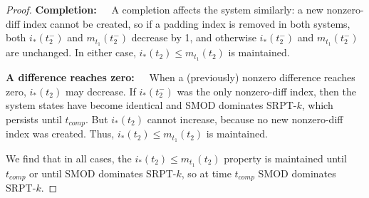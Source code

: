 \documentclass[acmsmall]{acmart}
\begin{document}
\begin{proof}
    \textbf{Completion:~~} A completion affects the system similarly: a new nonzero-diff index cannot be created, so if a padding index is removed in both systems, both $i_*(t_2^-)$ and $m_{t_1}(t_2^-)$ decrease by 1, and otherwise $i_*(t_2^-)$ and $m_{t_1}(t_2^-)$ are unchanged. In either case, $i_*(t_2) \le m_{t_1}(t_2)$ is maintained.

    \textbf{A difference reaches zero:~~} 
    When a (previously) nonzero difference reaches zero, $i_*(t_2)$ may decrease. If $i_*(t_2^-)$ was the only nonzero-diff index, then the system states have become identical and SMOD dominates SRPT-$k$,
    which persists until $t_{comp}$.
    But $i_*(t_2)$ cannot increase, because no new nonzero-diff index was created.
    Thus, $i_*(t_2) \le m_{t_1}(t_2)$ is maintained.

    We find that in all cases, the $i_*(t_2) \le m_{t_1}(t_2)$ property is maintained until $t_{comp}$ or until SMOD dominates SRPT-$k$, so at time $t_{comp}$ SMOD dominates SRPT-$k$.
\end{proof}
\end{document}
